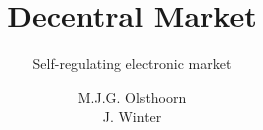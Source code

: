 \documentclass{tudelft-report}
\begin{document}

\title[tudelft-white]{Decentral Market}
\subtitle[tudelft-cyan]{Self-regulating electronic market}
\author[tudelft-white]{M.J.G. Olsthoorn \\ J. Winter}

\end{document}

